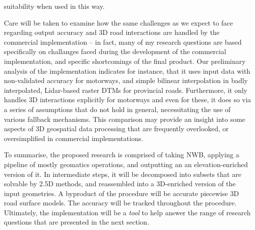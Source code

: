 suitability when used in this way.

Care will be taken to examine how the same challenges as we expect to face regarding output accuracy and 3D road interactions are handled by the commercial implementation – in fact, many of my research questions are based specifically on challanges faced during the development of the commercial implementation, and specific shortcomings of the final product. Our preliminary analysis of the implementation indicates for instance, that it uses input data with non-validated accuracy for motorways, and simple bilinear interpolation in badly interpolated, Lidar-based raster DTMs for provincial roads. Furthermore, it only handles 3D interactions explicitly for motorways and even for these, it does so via a series of assumptions that do not hold in general, necessitating the use of various fallback mechanisms. This comparison may provide an insight into some aspects of 3D geospatial data processing that are frequently overlooked, or oversimplified in commercial implementations.

To summarise, the proposed research is comprised of taking NWB, applying a pipeline of mostly geomatics operations, and outputting an an elevation-enriched version of it. In intermediate steps, it will be decomposed into subsets that are solvable by 2.5D methods, and reassembled into a 3D-enriched version of the input geometries. A byproduct of the procedure will be accurate piecewise 3D road surface models. The accuracy will be tracked throughout the procedure. Ultimately, the implementation will be a \textit{tool} to help answer the range of research questions that are presented in the next section.